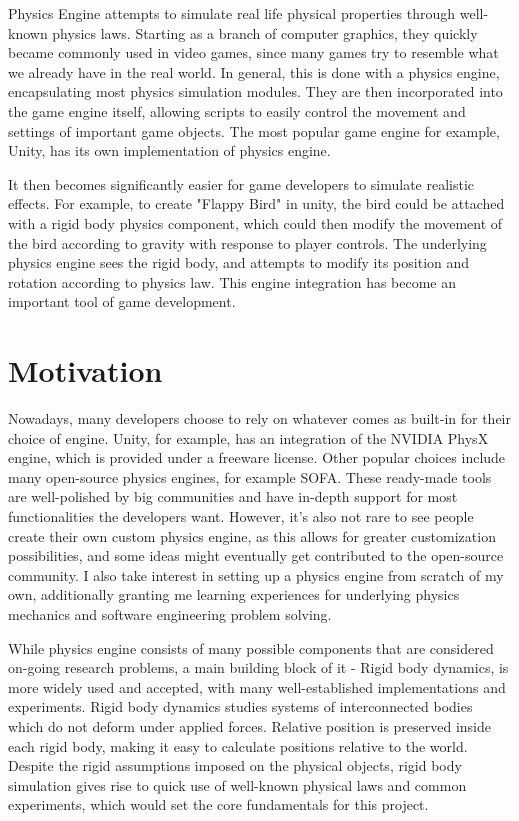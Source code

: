 \documentclass[12pt,a4paper,twoside,openright]{report}
\begin{document}
Physics Engine attempts to simulate real life physical properties through well-known physics laws. Starting as a branch of computer graphics, they quickly became commonly used in video games, since many games try to resemble what we already have in the real world. In general, this is done with a physics engine, encapsulating most physics simulation modules. They are then incorporated into the game engine itself, allowing scripts to easily control the movement and settings of important game objects. The most popular game engine for example, Unity\cite{unity}, has its own implementation of physics engine.

It then becomes significantly easier for game developers to simulate realistic effects. For example, to create "Flappy Bird\cite{flappybird}" in unity, the bird could be attached with a rigid body physics component, which could then modify the movement of the bird according to gravity with response to player controls. The underlying physics engine sees the rigid body, and attempts to modify its position and rotation according to physics law. This engine integration has become an important tool of game development.

\section{Motivation}

Nowadays, many developers choose to rely on whatever comes as built-in for their choice of engine. Unity, for example, has an integration of the NVIDIA PhysX engine, which is provided under a freeware license. Other popular choices include many open-source physics engines, for example SOFA\cite{sofa}. These ready-made tools are well-polished by big communities and have in-depth support for most functionalities the developers want. However, it's also not rare to see people create their own custom physics engine, as this allows for greater customization possibilities, and some ideas might eventually get contributed to the open-source community. I also take interest in setting up a physics engine from scratch of my own, additionally granting me learning experiences for underlying physics mechanics and software engineering problem solving.

While physics engine consists of many possible components that are considered on-going research problems, a main building block of it - Rigid body dynamics\cite{rigidbodydynamics}, is more widely used and accepted, with many well-established implementations and experiments. Rigid body dynamics studies systems of interconnected bodies which do not deform under applied forces. Relative position is preserved inside each rigid body, making it easy to calculate positions relative to the world. Despite the rigid assumptions imposed on the physical objects, rigid body simulation gives rise to quick use of well-known physical laws and common experiments, which would set the core fundamentals for this project.
\end{document}
